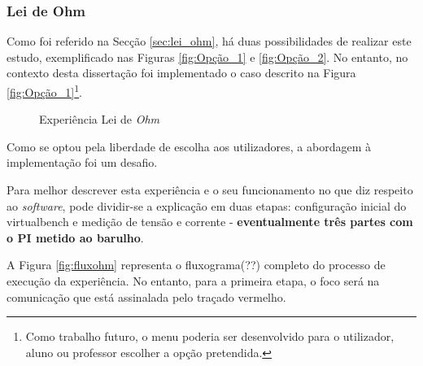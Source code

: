 \subsubsection{Lei de Ohm}
Como foi referido na Secção \ref{sec:lei_ohm}, há duas possibilidades de realizar este estudo, exemplificado nas Figuras \ref{fig:Opção_1} e \ref{fig:Opção_2}. No entanto, no contexto desta dissertação foi  implementado o caso descrito na Figura \ref{fig:Opção_1}\footnote{Como trabalho futuro, o menu poderia ser desenvolvido para o utilizador, aluno ou professor escolher a opção pretendida.}. 

\begin{figure}[hbtp]
	\centering%
		\centering
		\qquad
		\caption{Experiência Lei de \textit{Ohm}}%
		\label{fig:experienciaOHM}%
	\end{figure}

Como se optou pela liberdade de escolha aos utilizadores, a abordagem à implementação foi um desafio.

Para melhor descrever esta experiência e o seu funcionamento no que diz respeito ao \textit{software}, pode dividir-se a explicação em duas etapas: configuração inicial do \acrshort{virtualbench} e medição de tensão e corrente - \textbf{eventualmente três partes com o PI metido ao barulho}. 

A Figura \ref{fig:fluxohm} representa o fluxograma(??) completo do processo de execução da experiência. No entanto, para a primeira etapa, o foco será na comunicação que está assinalada pelo traçado vermelho.


